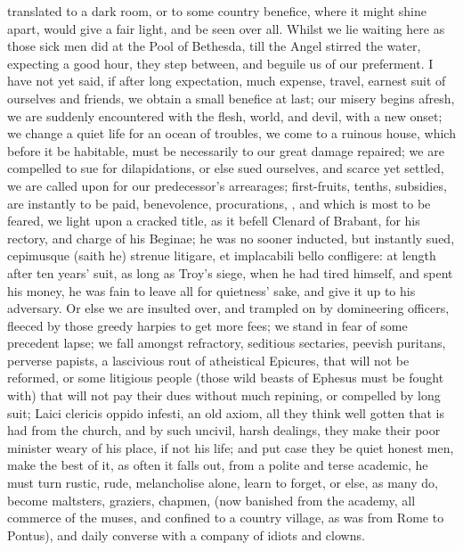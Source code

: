 {{translated to a dark room, or to some country benefice, where it might
shine apart, would give a fair light, and be seen over all. Whilst we
lie waiting here as those sick men did at the Pool of  Bethesda,
till the Angel stirred the water, expecting a good hour, they step
between, and beguile us of our preferment. I have not yet said, if
after long expectation, much expense, travel, earnest suit of ourselves
and friends, we obtain a small benefice at last; our misery begins
afresh, we are suddenly encountered with the flesh, world, and devil,
with a new onset; we change a quiet life for an ocean of troubles, we
come to a ruinous house, which before it be habitable, must be
necessarily to our great damage repaired; we are compelled to sue for
dilapidations, or else sued ourselves, and scarce yet settled, we are
called upon for our predecessor's arrearages; first-fruits, tenths,
subsidies, are instantly to be paid, benevolence, procurations, \etc{},
and which is most to be feared, we light upon a cracked title, as it
befell Clenard of Brabant, for his rectory, and charge of his Beginae;
he was no sooner inducted, but instantly sued, cepimusque (saith
he) strenue litigare, et implacabili bello confligere: at length after
ten years' suit, as long as Troy's siege, when he had tired himself,
and spent his money, he was fain to leave all for quietness' sake, and
give it up to his adversary. Or else we are insulted over, and trampled
on by domineering officers, fleeced by those greedy harpies to get more
fees; we stand in fear of some precedent lapse; we fall amongst
refractory, seditious sectaries, peevish puritans, perverse papists, a
lascivious rout of atheistical Epicures, that will not be reformed, or
some litigious people (those wild beasts of Ephesus must be fought
with) that will not pay their dues without much repining, or compelled
by long suit; Laici clericis oppido infesti, an old axiom, all they
think well gotten that is had from the church, and by such uncivil,
harsh dealings, they make their poor minister weary of his place, if
not his life; and put case they be quiet honest men, make the best of
it, as often it falls out, from a polite and terse academic, he must
turn rustic, rude, melancholise alone, learn to forget, or else, as
many do, become maltsters, graziers, chapmen, \etc{} (now banished from
the academy, all commerce of the muses, and confined to a country
village, as \Ovid was from Rome to Pontus), and daily converse with a
company of idiots and clowns.

}}
